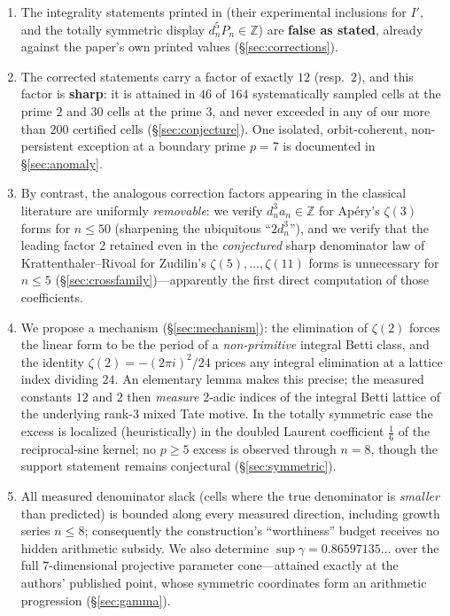 \documentclass[11pt]{article}
\theoremstyle{definition}
\newcommand{\dn}[1]{d_{#1}}
\newcommand{\Z}{\mathbb{Z}}
\begin{document}
\begin{enumerate}
\item The integrality statements printed in \cite{BZ} (their
experimental inclusions for $I'$, and the totally symmetric display
$\dn{n}^5 P_n\in\Z$) are \textbf{false as stated}, already against the
paper's own printed values (\S\ref{sec:corrections}).
\item The corrected statements carry a factor of exactly $12$
(resp.\ $2$), and this factor is \textbf{sharp}: it is attained in
$46$ of $164$ systematically sampled cells at the prime $2$ and $30$
cells at the prime $3$, and never exceeded in any of our more than
$200$ certified cells (\S\ref{sec:conjecture}). One isolated,
orbit-coherent, non-persistent exception at a boundary prime $p=7$ is
documented in \S\ref{sec:anomaly}.
\item By contrast, the analogous correction factors appearing in the
classical literature are uniformly \emph{removable}: we verify
$\dn{n}^3 a_n\in\Z$ for Ap\'ery's $\zeta(3)$ forms for $n\le 50$
(sharpening the ubiquitous ``$2\dn{n}^3$''), and we verify that the
leading factor $2$ retained even in the \emph{conjectured} sharp
denominator law of Krattenthaler--Rivoal \cite[eq.~(17.1)]{KR} for
Zudilin's $\zeta(5),\dots,\zeta(11)$ forms is unnecessary for $n\le5$
(\S\ref{sec:crossfamily})---apparently the first direct computation of
those coefficients.
\item We propose a mechanism (\S\ref{sec:mechanism}): the elimination of
$\zeta(2)$ forces the linear form to be the period of a
\emph{non-primitive} integral Betti class, and the identity
$\zeta(2)=-(2\pi i)^2/24$ prices any integral elimination at a lattice
index dividing $24$. An elementary lemma makes this precise; the
measured constants $12$ and $2$ then \emph{measure} $2$-adic indices of
the integral Betti lattice of the underlying rank-$3$ mixed Tate motive.
In the totally symmetric case the excess is localized (heuristically)
in the doubled Laurent coefficient $\tfrac16$ of the reciprocal-sine
kernel; no $p\ge5$ excess is observed through $n=8$, though the support
statement remains conjectural (\S\ref{sec:symmetric}).
\item All measured denominator slack (cells where the true denominator
is \emph{smaller} than predicted) is bounded along every measured
direction, including growth series $n\le8$; consequently the
construction's ``worthiness'' budget receives no hidden arithmetic
subsidy. We also determine $\sup\gamma=0.86597135\ldots$ over the full
$7$-dimensional projective parameter cone---attained exactly at the
authors' published point, whose symmetric coordinates form an arithmetic
progression (\S\ref{sec:gamma}).
\end{enumerate}
\end{document}
